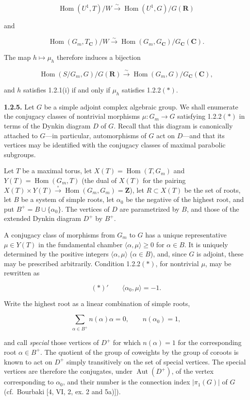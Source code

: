 \documentclass[10pt,a4paper]{article}
\begin{document}
\[
\operatorname{Hom}(U^1,T)/W\xrightarrow{\sim}\operatorname{Hom}(U^1,G)/G(\mathbf R)
\]

and

\[
\operatorname{Hom}(G_m,T_{\mathbf C})/W\xrightarrow{\sim}\operatorname{Hom}(G_m,G_{\mathbf C})/G_{\mathbf C}(\mathbf C).
\]

The map \(h\mapsto\mu_h\) therefore induces a bijection

\[
\operatorname{Hom}(S/G_m,G)/G(\mathbf R)\xrightarrow{\sim}\operatorname{Hom}(G_m,G)/G_{\mathbf C}(\mathbf C),
\]

and \(h\) satisfies 1.2.1(i) if and only if \(\mu_h\) satisfies 1.2.2\((*)\).

\textbf{1.2.5.} Let \(G\) be a simple adjoint complex algebraic group. We shall enumerate the conjugacy classes of nontrivial morphisms \(\mu:G_m\to G\) satisfying 1.2.2\((*)\) in terms of the Dynkin diagram \(D\) of \(G\). Recall that this diagram is canonically attached to \(G\)---in particular, automorphisms of \(G\) act on \(D\)---and that its vertices may be identified with the conjugacy classes of maximal parabolic subgroups.

Let \(T\) be a maximal torus, let \(X(T)=\operatorname{Hom}(T,G_m)\) and \(Y(T)=\operatorname{Hom}(G_m,T)\) (the dual of \(X(T)\) for the pairing \(X(T)\times Y(T)\xrightarrow{\circ}\operatorname{Hom}(G_m,G_m)=\mathbf Z\)), let \(R\subset X(T)\) be the set of roots, let \(B\) be a system of simple roots, let \(\alpha_0\) be the negative of the highest root, and put \(B^+=B\cup\{\alpha_0\}\). The vertices of \(D\) are parametrized by \(B\), and those of the extended Dynkin diagram \(D^+\) by \(B^+\).

A conjugacy class of morphisms from \(G_m\) to \(G\) has a unique representative \(\mu\in Y(T)\) in the fundamental chamber \(\langle\alpha,\mu\rangle\ge0\) for \(\alpha\in B\). It is uniquely determined by the positive integers \(\langle\alpha,\mu\rangle\) (\(\alpha\in B\)), and, since \(G\) is adjoint, these may be prescribed arbitrarily. Condition 1.2.2\((*)\), for nontrivial \(\mu\), may be rewritten as

\[
(*)'\qquad \langle\alpha_0,\mu\rangle=-1.
\]

Write the highest root as a linear combination of simple roots,

\[
\sum_{\alpha\in B^+}n(\alpha)\alpha=0,
\qquad n(\alpha_0)=1,
\]

and call \emph{special} those vertices of \(D^+\) for which \(n(\alpha)=1\) for the corresponding root \(\alpha\in B^+\). The quotient of the group of coweights by the group of coroots is known to act on \(D^+\) simply transitively on the set of special vertices. The special vertices are therefore the conjugates, under \(\operatorname{Aut}(D^+)\), of the vertex corresponding to \(\alpha_0\), and their number is the connection index \(|\pi_1(G)|\) of \(G\) (cf.~Bourbaki {[}4, VI, 2, ex. 2 and 5a){]}).
\end{document}
